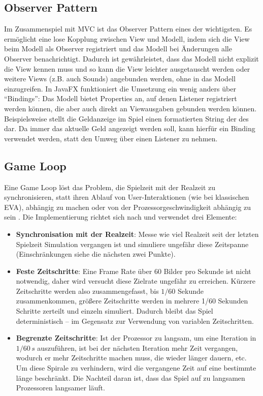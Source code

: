 \subsection{Observer Pattern} %
\label{sub:observer}
Im Zusammenspiel mit MVC ist das Observer Pattern eines der wichtigsten. Es ermöglicht eine lose Kopplung zwischen View und Modell, indem sich die View beim Modell als Observer registriert und das Modell bei Änderungen alle Observer benachrichtigt. Dadurch ist gewährleistet, dass das Modell nicht explizit die View kennen muss und so kann die View leichter ausgetauscht werden oder weitere Views (z.B. auch Sounds) angebunden werden, ohne in das Modell einzugreifen. In JavaFX funktioniert die Umsetzung ein wenig anders über \enquote{Bindings}: Das Modell bietet Properties an, auf denen Listener registriert werden können, die aber auch direkt an Viewausgaben gebunden werden können. Beispielsweise stellt die Geldanzeige im Spiel einen formatierten String der  des  dar. Da immer das aktuelle Geld angezeigt werden soll, kann hierfür ein Binding verwendet werden, statt den Umweg über einen Listener zu nehmen.

\subsection{Game Loop} %
\label{sub:gameloop}
Eine Game Loop löst das Problem, die Spielzeit mit der Realzeit zu synchronisieren, statt ihren Ablauf von User-Interaktionen (wie bei klassischen EVA), abhängig zu machen oder von der Prozessorgeschwindigkeit abhängig zu sein . Die Implementierung richtet sich nach  und verwendet drei Elemente:
\begin{itemize}
	\item \textbf{Synchronisation mit der Realzeit}: Messe wie viel Realzeit seit der letzten Spielzeit Simulation vergangen ist und simuliere ungefähr diese Zeitspanne (Einschränkungen siehe die nächsten zwei Punkte).

	\item \textbf{Feste Zeitschritte}: Eine Frame Rate über 60 Bilder pro Sekunde ist nicht notwendig, daher wird versucht diese Zielrate ungefähr zu erreichen. Kürzere Zeitschritte werden also zusammengefasst, bis \(1/60\) Sekunde zusammenkommen, größere Zeitschritte werden in mehrere 1/60 Sekunden Schritte zerteilt und einzeln simuliert. Dadurch bleibt das Spiel deterministisch -- im Gegensatz zur Verwendung von variablen Zeitschritten.

	\item \textbf{Begrenzte Zeitschritte}: Ist der Prozessor zu langsam, um eine Iteration in \(1/60\,s\) auszuführen, ist bei der nächsten Iteration mehr Zeit vergangen, wodurch er mehr Zeitschritte machen muss, die wieder länger dauern, etc. Um diese Spirale zu verhindern, wird die vergangene Zeit auf eine bestimmte länge beschränkt. Die Nachteil daran ist, dass das Spiel auf zu langsamen Prozessoren langsamer läuft.
\end{itemize}

